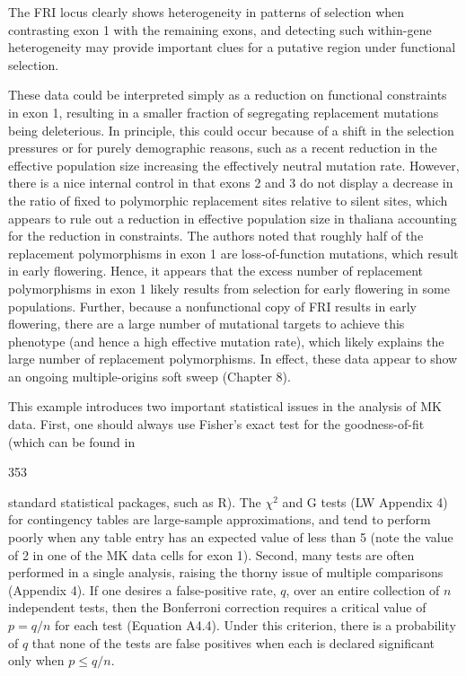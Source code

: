 \documentclass{article}
\begin{document}
The FRI locus clearly shows heterogeneity in patterns of selection when contrasting exon 1 with the remaining exons, and detecting such within-gene heterogeneity may provide important clues for a putative region under functional selection.

These data could be interpreted simply as a reduction on functional constraints in exon 1, resulting in a smaller fraction of segregating replacement mutations being deleterious. In principle, this could occur because of a shift in the selection pressures or for purely demographic reasons, such as a recent reduction in the effective population size increasing the effectively neutral mutation rate. However, there is a nice internal control in that exons 2 and 3 do not display a decrease in the ratio of fixed to polymorphic replacement sites relative to silent sites, which appears to rule out a reduction in effective population size in thaliana accounting for the reduction in constraints. The authors noted that roughly half of the replacement polymorphisms in exon 1 are loss-of-function mutations, which result in early flowering. Hence, it appears that the excess number of replacement polymorphisms in exon 1 likely results from selection for early flowering in some populations. Further, because a nonfunctional copy of FRI results in early flowering, there are a large number of mutational targets to achieve this phenotype (and hence a high effective mutation rate), which likely explains the large number of replacement polymorphisms. In effect, these data appear to show an ongoing multiple-origins soft sweep (Chapter 8).

This example introduces two important statistical issues in the analysis of MK data. First, one should always use Fisher's exact test for the goodness-of-fit (which can be found in

353

standard statistical packages, such as R). The  $ \chi^2 $ and G tests (LW Appendix 4) for contingency tables are large-sample approximations, and tend to perform poorly when any table entry has an expected value of less than 5 (note the value of 2 in one of the MK data cells for exon 1). Second, many tests are often performed in a single analysis, raising the thorny issue of multiple comparisons (Appendix 4). If one desires a false-positive rate,  $ q $, over an entire collection of  $ n $ independent tests, then the Bonferroni correction requires a critical value of  $ p = q/n $ for each test (Equation A4.4). Under this criterion, there is a probability of  $ q $ that none of the tests are false positives when each is declared significant only when  $ p \leq q/n $.
\end{document}

